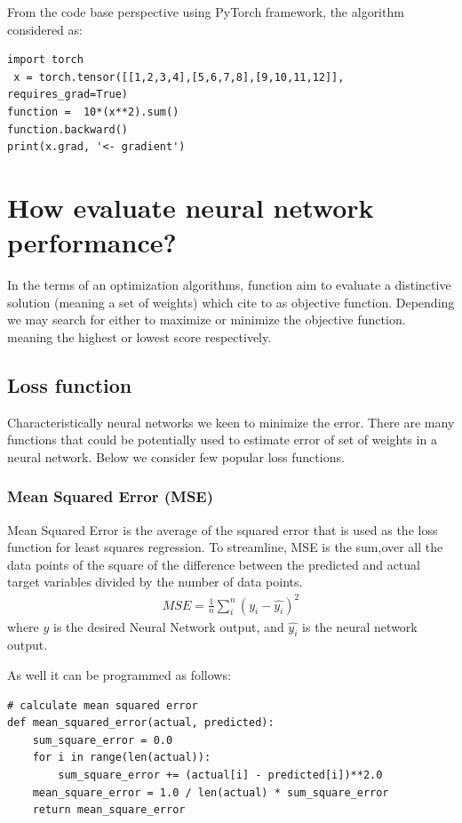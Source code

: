 \documentclass{article}
\begin{document}
From the code base perspective using PyTorch framework, the algorithm considered as:
\begin{lstlisting}
import torch
 x = torch.tensor([[1,2,3,4],[5,6,7,8],[9,10,11,12]],                requires_grad=True) 
function =  10*(x**2).sum()
function.backward()
print(x.grad, '<- gradient')
\end{lstlisting}

\section{How evaluate neural network performance?}
In the terms of an optimization algorithms, function aim to evaluate a distinctive solution (meaning a set of weights) which cite to as objective function. Depending we may search for either to maximize or minimize the objective function. meaning the highest or lowest score respectively.
\subsection{Loss function}
Characteristically neural networks we keen to minimize the error. There are many functions that could be potentially used to estimate error of set of weights in a neural network. Below we consider few popular loss functions.

\subsubsection{Mean Squared Error (MSE)}
Mean Squared Error is the average of the squared error that is used as the loss function for least squares regression. To streamline, MSE is the sum,over all the data points of the square of the difference between the predicted and actual target variables divided by the number of data points.
\begin{align*}
MSE = \frac{{1}}{n} \sum_{i}^{n} (y_i - \widehat{y_i})^2
\end{align*}
where $y$ is the desired Neural Network output, and $\widehat{y_i}$ is the neural network output.

As well it can be programmed as follows:
\begin{lstlisting}
# calculate mean squared error
def mean_squared_error(actual, predicted):
	sum_square_error = 0.0
	for i in range(len(actual)):
		sum_square_error += (actual[i] - predicted[i])**2.0
	mean_square_error = 1.0 / len(actual) * sum_square_error
	return mean_square_error
\end{lstlisting}
\end{document}
